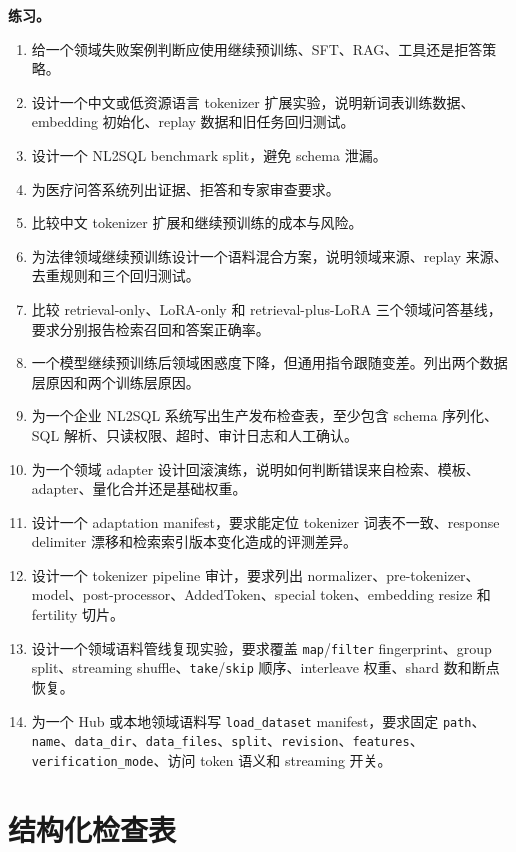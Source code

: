 \documentclass[UTF8,zihao=-4,openany]{ctexbook}
\begin{document}
\textbf{练习。}
\begin{enumerate}
\item 给一个领域失败案例判断应使用继续预训练、SFT、RAG、工具还是拒答策略。
\item 设计一个中文或低资源语言 tokenizer 扩展实验，说明新词表训练数据、embedding 初始化、replay 数据和旧任务回归测试。
\item 设计一个 NL2SQL benchmark split，避免 schema 泄漏。
\item 为医疗问答系统列出证据、拒答和专家审查要求。
\item 比较中文 tokenizer 扩展和继续预训练的成本与风险。
\item 为法律领域继续预训练设计一个语料混合方案，说明领域来源、replay 来源、去重规则和三个回归测试。
\item 比较 retrieval-only、LoRA-only 和 retrieval-plus-LoRA 三个领域问答基线，要求分别报告检索召回和答案正确率。
\item 一个模型继续预训练后领域困惑度下降，但通用指令跟随变差。列出两个数据层原因和两个训练层原因。
\item 为一个企业 NL2SQL 系统写出生产发布检查表，至少包含 schema 序列化、SQL 解析、只读权限、超时、审计日志和人工确认。
\item 为一个领域 adapter 设计回滚演练，说明如何判断错误来自检索、模板、adapter、量化合并还是基础权重。
\item 设计一个 adaptation manifest，要求能定位 tokenizer 词表不一致、response delimiter 漂移和检索索引版本变化造成的评测差异。
\item 设计一个 tokenizer pipeline 审计，要求列出 normalizer、pre-tokenizer、model、post-processor、AddedToken、special token、embedding resize 和 fertility 切片。
\item 设计一个领域语料管线复现实验，要求覆盖 \texttt{map}/\texttt{filter} fingerprint、group split、streaming shuffle、\texttt{take}/\texttt{skip} 顺序、interleave 权重、shard 数和断点恢复。
\item 为一个 Hub 或本地领域语料写 \texttt{load\_dataset} manifest，要求固定 \texttt{path}、\texttt{name}、\texttt{data\_dir}、\texttt{data\_files}、\texttt{split}、\texttt{revision}、\texttt{features}、\texttt{verification\_mode}、访问 token 语义和 streaming 开关。
\end{enumerate}

\section{结构化检查表}
\end{document}

